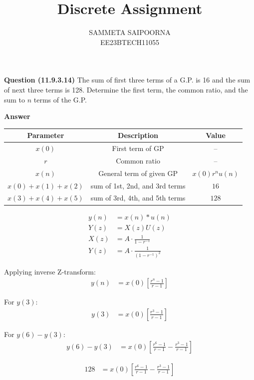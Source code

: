\documentclass[journal,12pt,onecolumn]{IEEEtran}
\title{Discrete Assignment}
\author{SAMMETA SAIPOORNA\\ EE23BTECH11055}
\theoremstyle{remark}
\begin{document}
\maketitle


\textbf{Question (11.9.3.14)}
The sum of first three terms of a G.P. is 16 and the sum of next three terms is 128. Determine the first term, the common ratio, and the sum to $n$ terms of the G.P.

\textbf{Answer}
\fi

\begin{tabular}{|c|c|c|}
      \hline
      Parameter & Description & Value\\\hline
      $x(0)$ & First term of GP & --\\\hline
      $r$ & Common ratio & --\\\hline
      $x(n)$ & General term of given GP & $x(0)r^nu(n)$\\\hline
      $x(0)+x(1)+x(2)$ & sum of 1st, 2nd, and 3rd terms & $16$\\\hline
      $x(3)+x(4)+x(5)$ & sum of 3rd, 4th, and 5th terms & $128$\\\hline
\end{tabular}

\begin{align}
    y(n) &= x(n) * u(n) \label{eq:11.9.3.14.1} \\
    Y(z) &= X(z) U(z) \label{eq:11.9.3.14.2} \\
    X(z) &= A \cdot \frac{1}{1 - r^{-1}} \label{eq:11.9.3.14.3} \\
    Y(z) &= A \cdot \frac{1}{(1 - r^{-1})^2} \label{eq:11.9.3.14.4}
\end{align}

Applying inverse Z-transform:
\begin{align}
y(n) &= x(0) \left[ \frac{r^n - 1}{r - 1} \right] \label{eq:11.9.3.14.5}
\end{align}

For $y(3)$:
\begin{align}
y(3) &= x(0) \left[ \frac{r^3 - 1}{r - 1} \right] \label{eq:11.9.3.14.6}
\end{align}

For $y(6) - y(3)$:
\begin{align}
y(6) - y(3) &= x(0) \left[ \frac{r^6 - 1}{r - 1} - \frac{r^3 - 1}{r - 1} \right] \label{eq:11.9.3.14.7}
\end{align}

\begin{align}
128 &= x(0)\left[\frac{r^6 - 1}{r - 1} - \frac{r^3 - 1}{r - 1}\right] \label{eq:11.9.3.14.8}
\end{align}
\end{document}
